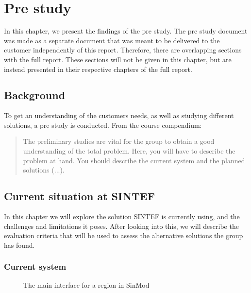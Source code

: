\documentclass[11pt,a4paper,titlepage,oneside]{report}
\begin{document}
\chapter{Pre study}
In this chapter, we present the findings of the pre study. The pre study document was made as a separate document that was meant to be delivered to the customer independently of this report. Therefore, there are overlapping sections with the full report. These sections will not be given in this chapter, but are instead presented in their respective chapters of the full report. 

\section{Background}
To get an understanding of the customers needs, as well as studying different solutions, a pre study is conducted. From the course compendium:
\begin{quote}
The preliminary studies are vital for the group to obtain a good understanding of the total problem.
Here, you will have to describe the problem at hand. You should describe the current system and the
planned solutions (...).
\cite{TDT4290:Intro}
\end{quote}

\section{Current situation at SINTEF}
In this chapter we will explore the solution SINTEF is currently using, and the challenges and limitations it poses. After looking into this, we will describe the evaluation criteria that will be used to assess the alternative solutions the group has found. 
\subsection{Current system}
\begin{figure}[h]
\begin{center}
\caption{The main interface for a region in SinMod}
\label{fig:sinmod-region-main-interface}
\end{center}
\end{figure}
\end{document}
